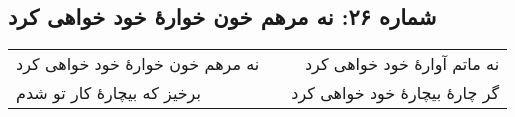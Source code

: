 \begin{center}
\section*{شماره ۲۶: نه مرهم خون خوارۀ خود خواهی کرد}
\label{sec:026}
\begin{longtable}{l p{0.5cm} r}
نه مرهم خون خوارهٔ خود خواهی کرد
&&
نه ماتم آوارهٔ خود خواهی کرد
\\
برخیز که بیچارهٔ کار تو شدم
&&
گر چارهٔ بیچارهٔ خود خواهی کرد
\\
\end{longtable}
\end{center}
